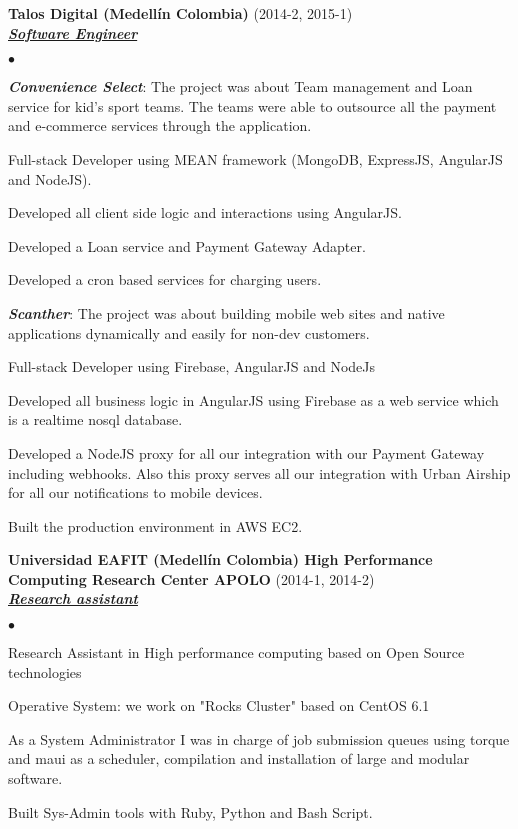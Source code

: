 \documentclass[a4paper]{article}
\newcommand{\employer}[3]{{
  \textbf{#1} (#2)\\ \underline{\textbf{\emph{#3}}}\\ }}
\newenvironment{achievements}{\begin{list}{$\bullet$}{\topsep 0pt \itemsep
  -2pt}}{\vspace*{4pt}\end{list}}
\newcommand{\emphasys}[1]{\textbf{\emph{#1}}}
\begin{document}
  \employer{ Talos Digital (Medell\'in Colombia)}{2014-2, 2015-1}{Software Engineer}
  \begin{achievements}
  \item \emphasys{Convenience Select}: The project was about Team management and Loan service for kid's sport teams. The teams were able to outsource all the payment and e-commerce services through the application.
  \item Full-stack Developer using MEAN framework  (MongoDB, ExpressJS, AngularJS and NodeJS).
  \item Developed all client side logic and interactions using AngularJS.
  \item Developed a Loan service and Payment Gateway Adapter.
  \item Developed a cron based services for charging users.
  \item \emphasys{Scanther}: The project was about building mobile web sites and native applications dynamically and easily for non-dev customers.
  \item Full-stack Developer using Firebase, AngularJS and NodeJs
  \item Developed all business logic in AngularJS using Firebase as a web service which is a realtime nosql database.
  \item Developed a NodeJS proxy for all our integration with our Payment Gateway including webhooks. Also this proxy serves all our integration with Urban Airship for all our notifications to mobile devices.
  \item Built the production environment in AWS EC2.
  \end{achievements}

  \newpage

  \employer{ Universidad EAFIT (Medell\'in Colombia) High Performance Computing Research Center APOLO}{2014-1, 2014-2}{Research assistant}
  \begin{achievements}
  \item Research Assistant in High performance computing based on Open Source technologies
  \item Operative System: we work on "Rocks Cluster" based on CentOS 6.1
  \item As a System Administrator I was in charge of job submission queues using torque and maui as a scheduler, compilation and installation of large and modular software.
  \item Built Sys-Admin tools with Ruby, Python and Bash Script.
  \end{achievements}
\end{document}
